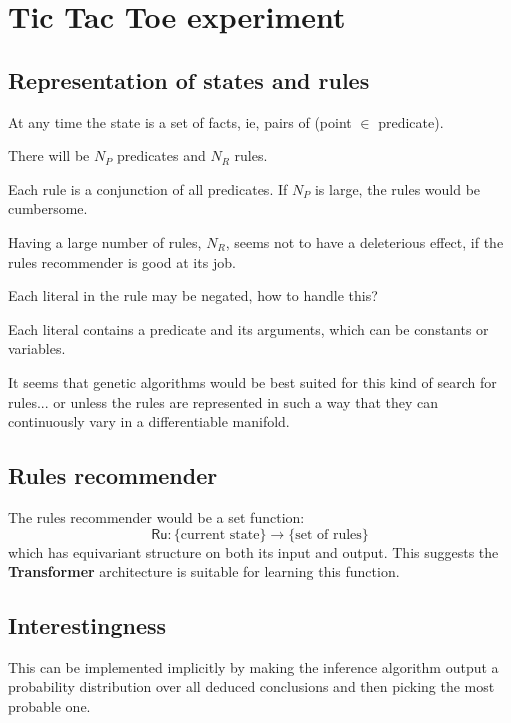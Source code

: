 \chapter{Tic Tac Toe experiment}\label{chap:TicTacToe}

\section{Representation of states and rules}

At any time the state is a set of facts, ie, pairs of (point $\in$ predicate).

There will be $N_P$ predicates and $N_R$ rules.

Each rule is a conjunction of all predicates.  If $N_P$ is large, the rules would be cumbersome.

Having a large number of rules, $N_R$, seems not to have a deleterious effect, if the rules recommender is good at its job.

Each literal in the rule may be negated, how to handle this?

Each literal contains a predicate and its arguments, which can be constants or variables.

It seems that genetic algorithms would be best suited for this kind of search for rules...  or unless the rules are represented in such a way that they can continuously vary in a differentiable manifold.



\section{Rules recommender}

The rules recommender would be a set function:
\begin{equation}
	\mathsf{Ru}: \{ \mbox{current state} \} \rightarrow \{ \mbox{set of rules} \}
\end{equation}
which has equivariant structure on both its input and output.  This suggests the \textbf{Transformer} architecture is suitable for learning this function.

\section{Interestingness}

This can be implemented implicitly by making the inference algorithm output a probability distribution over all deduced conclusions and then picking the most probable one.


